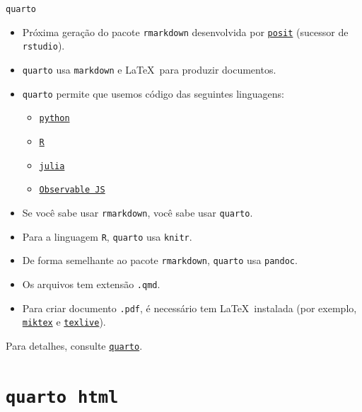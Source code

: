 \documentclass[
  10pt,
  ignorenonframetext,
]{beamer}
\providecommand{\tightlist}{%
  \setlength{\itemsep}{0pt}\setlength{\parskip}{0pt}}\usepackage{longtable,booktabs,array}
\begin{document}
\begin{frame}[fragile]{\texttt{quarto}}
\protect\hypertarget{quarto-1}{}
\begin{itemize}
\tightlist
\item
  Próxima geração do pacote \texttt{rmarkdown} desenvolvida por
  \href{https://posit.co/}{\texttt{posit}} (sucessor de
  \texttt{rstudio}).
\item
  \texttt{quarto} usa \texttt{markdown} e \LaTeX~para produzir
  documentos.
\item
  \texttt{quarto} permite que usemos código das seguintes linguagens:

  \begin{itemize}
  \tightlist
  \item
    \href{https://www.python.org/}{\texttt{python}}
  \item
    \href{https://cran.r-project.org/}{\texttt{R}}
  \item
    \href{https://julialang.org/}{\texttt{julia}}
  \item
    \href{https://observablehq.com/@observablehq/observable-javascript}{\texttt{Observable\ JS}}
  \end{itemize}
\item
  Se você sabe usar \texttt{rmarkdown}, você sabe usar \texttt{quarto}.
\item
  Para a linguagem \texttt{R}, \texttt{quarto} usa \texttt{knitr}.
\item
  De forma semelhante ao pacote \texttt{rmarkdown}, \texttt{quarto} usa
  \texttt{pandoc}.
\item
  Os arquivos tem extensão \texttt{.qmd}.
\item
  Para criar documento \texttt{.pdf}, é necessário tem \LaTeX~instalada
  (por exemplo, \href{https://miktex.org/}{\texttt{miktex}} e
  \href{https://tug.org/texlive/}{\texttt{texlive}}).
\end{itemize}

Para detalhes, consulte \href{https://quarto.org/}{\texttt{quarto}}.
\end{frame}

\hypertarget{quarto-html}{%
\section{\texorpdfstring{\texttt{quarto}\newline\newline~\texttt{html}}{quarto~html}}\label{quarto-html}}
\end{document}
